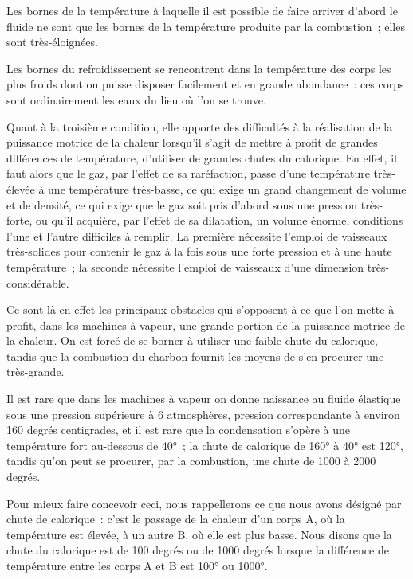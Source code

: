 \documentclass[french,twoside]{book} %
\begin{document}
\noindent Les bornes de la température à laquelle il est possible de faire arriver d’abord le fluide ne sont que les bornes de la température produite par la combustion ; elles sont très-éloignées.\par
Les bornes du refroidissement se rencontrent dans la température des corps les plus froids dont on puisse disposer facilement et en grande abondance : ces corps sont ordinairement les eaux du lieu où l’on se trouve.\par
Quant à la troisième condition, elle apporte des difficultés à la réalisation de la puissance motrice de la chaleur lorsqu’il s’agit de mettre à profit de grandes différences de température, d’utiliser de grandes chutes du calorique. En effet, il faut alors que le gaz, par l’effet de sa raréfaction, passe d’une température très-élevée à une température très-basse, ce qui exige un grand changement de volume et de densité, ce qui exige que le gaz soit pris d’abord sous une pression très-forte, ou qu’il acquière, par l’effet de sa dilatation, un volume énorme, conditions l’une et l’autre difficiles à remplir. La première nécessite l’emploi de vaisseaux très-solides pour contenir le gaz à la fois sous une forte pression et à une haute température ; la seconde nécessite l’emploi de vaisseaux d’une dimension très-considérable.\par
Ce sont là en effet les principaux obstacles qui s’opposent à ce que l’on mette à profit, dans les machines à vapeur, une grande portion de la puissance motrice de la chaleur. On est forcé de se borner à utiliser une faible chute du calorique, tandis que la combustion du charbon fournit les moyens de s’en procurer une très-grande.\par
Il est rare que dans les machines à vapeur on donne naissance au fluide élastique sous une pression supérieure à 6 atmosphères, pression correspondante à environ 160 degrés centigrades, et il est rare que la condensation s’opère à une température fort au-dessous de 40° ; la chute de calorique de 160° à 40° est 120°, tandis qu’on peut se procurer, par la combustion, une chute de 1000 à 2000 degrés.\par
Pour mieux faire concevoir ceci, nous rappellerons ce que nous avons désigné par chute de calorique : c’est le passage de la chaleur d’un corps A, où la température est élevée, à un autre B, où elle est plus basse. Nous disons que la chute du calorique est de 100 degrés ou de 1000 degrés lorsque la différence de température entre les corps A et B est 100° ou 1000°.\par
\end{document}
